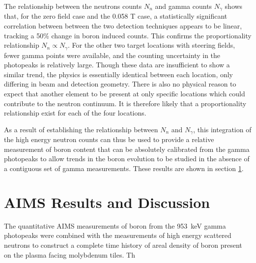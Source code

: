 \documentclass[final,3p,times,twocolumn]{elsarticle}
\begin{document}
The relationship between the neutrons counts $N_n$ and gamma counts $N_\gamma$ shows that, for the zero field case and the 0.058 T case, a statistically significant correlation between between the two detection techniques appears to be linear, tracking a 50\% change in boron induced counts.  This confirms the proportionality relationship $N_n \propto N_\gamma$.  For the other two target locations with steering fields, fewer gamma points were available, and the counting uncertainty in the photopeaks is relatively large.  %
Though these data are insufficient to show a similar trend, the physics is essentially identical between each location, only differing in beam and detection geometry.  There is also no physical reason to expect that another element to be present at only specific locations which could contribute to the neutron continuum.  It is therefore likely that a proportionality relationship exist for each of the four locations.


As a result of establishing the relationship between $N_n$ and $N_\gamma$, this integration of the high energy neutron counts can thus be used to provide a relative measurement of boron content that can be absolutely calibrated from the gamma photopeaks to allow trends in the boron evolution to be studied in the absence of a contiguous set of gamma measurements. These results are shown in section \ref{sec:Results}.

\section{AIMS Results and Discussion}
\label{sec:Results}

The quantitative AIMS measurements of boron from the 953~keV gamma photopeaks were combined with the measurements of high energy scattered neutrons to construct a complete time history of areal density of boron present on the plasma facing molybdenum tiles. Th
\end{document}
